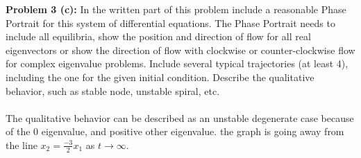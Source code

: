 \documentclass[12pt]{article}
\begin{document}
\vspace{\baselineskip}
\vspace{\baselineskip}
\vspace{\baselineskip}

\noindent \textbf{Problem 3 (c): }In the written part of this problem include a reasonable Phase Portrait for this system of differential equations. The Phase Portrait needs to include all equilibria, show the position and direction of flow for all real eigenvectors or show the direction of flow with clockwise or counter-clockwise flow for complex eigenvalue problems. Include several typical trajectories (at least 4), including the one for the given initial condition. Describe the qualitative behavior, such as stable node, unstable spiral, etc.
\\ \\
The qualitative behavior can be described as an unstable degenerate case because of the 0 eigenvalue, and positive other eigenvalue. the graph is going away from the line $x_2 = \frac{-3}{2}x_1$ as $t \rightarrow \infty$.

\newpage 
\end{document}
